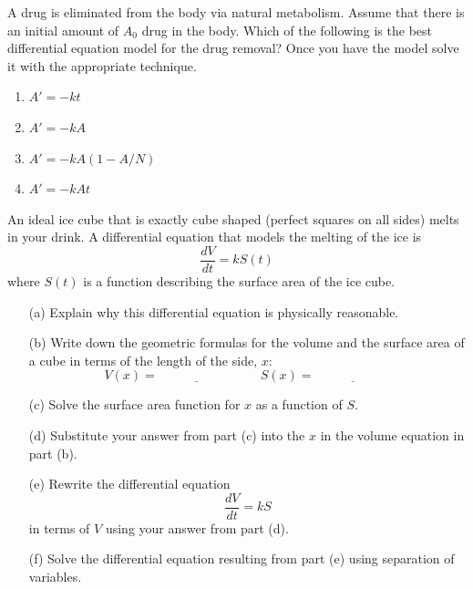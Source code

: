 \begin{problem}
    A drug is eliminated from the body via natural metabolism.  Assume that there is an
    initial amount of $A_0$ drug in the body.  Which of the following is the best
    differential equation model for the drug removal?  Once you have the model solve it
    with the appropriate technique.
    \begin{enumerate}
        \item $A' = -kt$
        \item $A' = -kA$
        \item $A' = -kA(1-A/N)$
        \item $A' = -kAt$
    \end{enumerate}
\end{problem}

\begin{problem}
    An ideal ice cube that is exactly cube shaped (perfect squares on all sides) melts in
    your drink.  A differential equation that models the melting of the ice is 
    \[ \frac{dV}{dt} = k S(t) \]
    where $S(t)$ is a function describing the surface area of the ice cube.  
    \begin{enumerate}
        \item[(a)] Explain why this differential equation is physically reasonable.
        \item[(b)] Write down the geometric formulas for the volume and the surface area
            of a cube in terms of the length of the side, $x$:
            \[ V(x) = \underline{\hspace{1in}} \qquad S(x) = \underline{\hspace{1in}} \]
        \item[(c)] Solve the surface area function for $x$ as a function of $S$.
        \item[(d)] Substitute your answer from part (c) into the $x$ in the volume
            equation in part (b). 
        \item[(e)] Rewrite the differential equation 
            \[ \frac{dV}{dt} = kS \]
            in terms of $V$ using your answer from part (d).
        \item[(f)] Solve the differential equation resulting from part (e) using
            separation of variables.
    \end{enumerate}
\end{problem}


